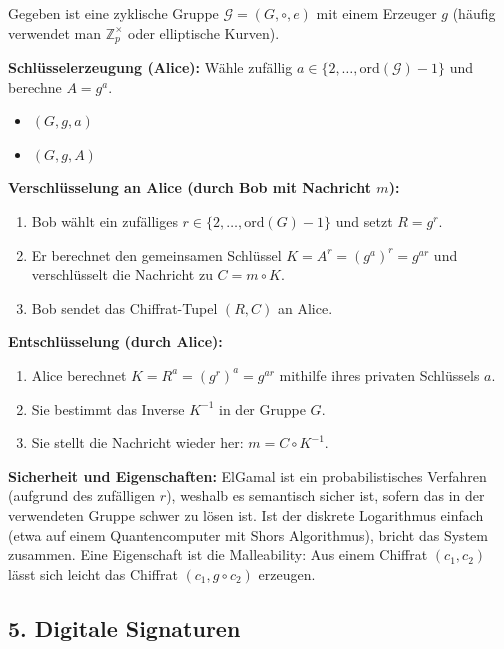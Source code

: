 \documentclass[
../../css_summary.tex,
]
{subfiles}
\begin{document}
\begin{defbox}
   Gegeben ist eine zyklische Gruppe $\mathcal{G} = (G, \circ, e)$ mit einem Erzeuger $g$ (häufig verwendet man $\mathbb{Z}_p^{\times}$ oder elliptische Kurven).

   \textbf{Schlüsselerzeugung (Alice):}
   Wähle zufällig $a \in \{2, \dots, \text{ord}(\mathcal{G})-1\}$ und berechne $A = g^a$.
   \begin{itemize}
      \item {} $(G, g, a)$
      \item {} $(G, g, A)$
   \end{itemize}

   \textbf{Verschlüsselung an Alice (durch Bob mit Nachricht $m$):}
   \begin{enumerate}
      \item Bob wählt ein zufälliges $r \in \{2, \dots, \text{ord}(G)-1\}$ und setzt $R = g^r$.
      \item Er berechnet den gemeinsamen Schlüssel $K = A^r = (g^a)^r = g^{ar}$ und verschlüsselt die Nachricht zu $C = m \circ K$.
      \item Bob sendet das Chiffrat-Tupel $(R, C)$ an Alice.
   \end{enumerate}

   \textbf{Entschlüsselung (durch Alice):}
   \begin{enumerate}
      \item Alice berechnet $K = R^a = (g^r)^a = g^{ar}$ mithilfe ihres privaten Schlüssels $a$.
      \item Sie bestimmt das Inverse $K^{-1}$ in der Gruppe $G$.
      \item Sie stellt die Nachricht wieder her: $m = C \circ K^{-1}$.
   \end{enumerate}
\end{defbox}

\textbf{Sicherheit und Eigenschaften:} ElGamal ist ein probabilistisches Verfahren (aufgrund des zufälligen $r$), weshalb es semantisch sicher ist, sofern das  in der verwendeten Gruppe schwer zu lösen ist. Ist der diskrete Logarithmus einfach (etwa auf einem Quantencomputer mit Shors Algorithmus), bricht das System zusammen. Eine Eigenschaft ist die Malleability: Aus einem Chiffrat $(c_1, c_2)$ lässt sich leicht das Chiffrat $(c_1, g \circ c_2)$ erzeugen.

\subsection*{5. Digitale Signaturen}
\end{document}
